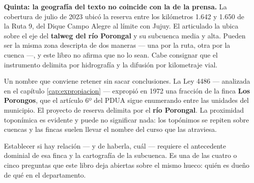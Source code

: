\begin{cautela}
\textbf{Quinta: la geografía del texto no coincide con la de la prensa.} La cobertura de julio de 2023 ubicó la reserva entre los kilómetros 1.642 y 1.650 de la Ruta 9, del Dique Campo Alegre al límite con Jujuy. El articulado la ubica sobre el eje del \textbf{talweg del río Porongal} y su subcuenca media y alta. Pueden ser la misma zona descripta de dos maneras --- una por la ruta, otra por la cuenca ---, y este libro no afirma que no lo sean. Cabe consignar que el instrumento delimita por hidrografía y la difusión por kilometraje vial.
\end{cautela}

\begin{cautela}
Un nombre que conviene retener sin sacar conclusiones. La Ley 4486 --- analizada en el capítulo \ref{cap:expropiacion} --- expropió en 1972 una fracción de la finca \textbf{Los Porongos}, que el artículo 6º del PDUA sigue enumerando entre las unidades del municipio. El proyecto de reserva delimita por el \textbf{río Porongal}. La proximidad toponímica es evidente y puede no significar nada: los topónimos se repiten sobre cuencas y las fincas suelen llevar el nombre del curso que las atraviesa.

Establecer si hay relación --- y de haberla, cuál --- requiere el antecedente dominial de esa finca y la cartografía de la subcuenca. Es una de las cuatro o cinco preguntas que este libro deja abiertas sobre el mismo hueco: quién es dueño de qué en el departamento.
\end{cautela}

